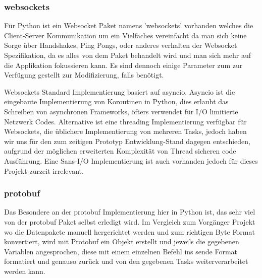 \subsubsection{websockets}
Für Python ist ein Websocket Paket namens 'websockets' vorhanden welches die Client-Server Kommunikation
um ein Vielfaches vereinfacht da man sich keine Sorge über Handshakes, Ping Pongs, oder anderes verhalten
der Websocket Spezifikation, da es alles von dem Paket behandelt wird 
und man sich mehr auf die Applikation fokussieren kann. 
Es sind dennoch einige Parameter zum zur Verfügung gestellt zur Modifizierung, 
falls benötigt.

Websockets Standard Implementierung basiert auf asyncio.
%  
Asyncio ist die eingebaute Implementierung von Koroutinen in Python,
dies erlaubt das Schreiben von asynchronen Frameworks, 
öfters verwendet für I/O limitierte Netzwerk Codes.
Alternative ist eine threading Implementierung verfügbar für Websockets, 
die üblichere Implementierung von mehreren Tasks, 
jedoch haben wir uns für den zum zeitigen Prototyp Entwicklung-Stand dagegen entschieden,
aufgrund der möglichen erweiterten Komplexität von Thread sicheren code Ausführung.
Eine Sans-I/O Implementierung ist auch vorhanden jedoch für dieses Projekt zurzeit irrelevant.

\subsubsection{protobuf}
Das Besondere an der protobuf Implementierung hier in Python ist,
das sehr viel von der protobuf Paket selbst erledigt wird.
Im Vergleich zum Vorgänger Projekt wo die Datenpakete manuell hergerichtet werden
und zum richtigen Byte Format konvertiert, wird mit Protobuf ein Objekt erstellt 
und jeweils die gegebenen Variablen angesprochen, 
diese mit einem einzelnen Befehl ins sende Format formatiert und genauso zurück
und von den gegebenen Tasks weiterverarbeitet werden kann.


